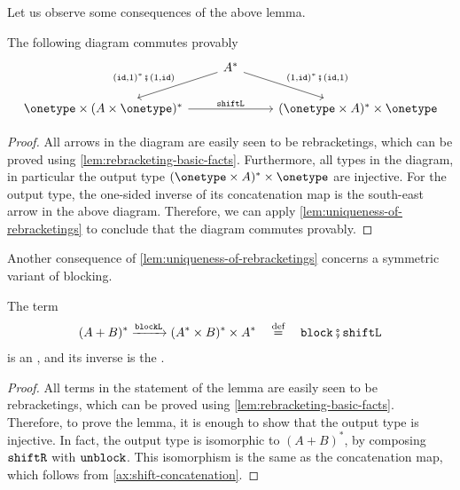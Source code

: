Let us observe some consequences of the above lemma. 
\begin{lemma}\label{lem:shift-ones}
The following diagram commutes provably
\begin{align*}
\begin{tikzcd}[ampersand replacement=\&]
 \& A^*
    \ar[dl, "{\appendoneterm^*\comp \prependoneterm}"']
    \ar[dr, "{\prependoneterm^*\comp \appendoneterm}"]
    \\
    \onetype \times (A \times\onetype)^* 
    \ar[rr, "\shiftlterm" ]
    \&
    \&
    (\onetype \times A)^* \times \onetype   
\end{tikzcd}
\end{align*}
\end{lemma}
\begin{proof}
        All arrows in the diagram are easily seen to be rebracketings, which can be proved using \cref{lem:rebracketing-basic-facts}. 
 Furthermore, all types in the diagram, in particular the output type  $(\onetype \times A)^* \times \onetype$ are injective. For the output type, the  one-sided inverse of its concatenation map is  the south-east arrow in the above diagram. 
     Therefore, we can apply \cref{lem:uniqueness-of-rebracketings} to conclude that the diagram commutes provably. 
\end{proof}

Another consequence of \cref{lem:uniqueness-of-rebracketings} concerns a symmetric variant of blocking.

\begin{lemma}\label{lem:shift-unsplit}
    The  term
    \begin{align*}
(A+B)^* \xrightarrow{\blocklterm} (A^* \times B)^* \times A^* 
\quad \eqdef \quad 
\blockterm\comp \shiftlterm
\end{align*}
is an , and its inverse is the .
\end{lemma}
\begin{proof}
    All terms in the statement of the lemma are easily seen to be rebracketings, which can be proved using \cref{lem:rebracketing-basic-facts}. Therefore, to prove the lemma, it is enough to show that the output type is injective. In fact, the output type is isomorphic to $(A+B)^*$, by composing $\mathtt{shiftR}$ with $\mathtt{unblock}$. 
    This isomorphism is the same as the concatenation map, which follows from \cref{ax:shift-concatenation}.
\end{proof}

